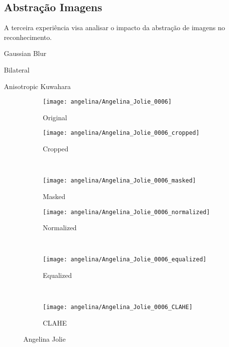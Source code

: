 \subsection{Abstração Imagens}
A terceira experiência visa analisar o impacto da abstração de imagens no reconhecimento.

Gaussian Blur

Bilateral

Anisotropic Kuwahara

\begin{figure}
        \centering
        \begin{subfigure}[b]{0.2\textwidth}
                \centering
                \texttt{[image: angelina/Angelina\_Jolie\_0006]}
                \caption{Original}
                \label{fig:original} 
        \end{subfigure}%
%

        \begin{subfigure}[b]{0.1\textwidth}
                \centering
                \texttt{[image: angelina/Angelina\_Jolie\_0006\_cropped]}
                \caption{Cropped}
                \label{fig:cropped} 
        \end{subfigure}
        ~ ~
        \begin{subfigure}[b]{0.1\textwidth}
                \centering
                \texttt{[image: angelina/Angelina\_Jolie\_0006\_masked]}
                \caption{Masked}
                \label{fig:masked}
        \end{subfigure}%
%

        \begin{subfigure}[b]{0.1\textwidth}
                \centering
                \texttt{[image: angelina/Angelina\_Jolie\_0006\_normalized]}
                \caption{Normalized}
                \label{fig:normalized} 
        \end{subfigure}
        ~ ~
        \begin{subfigure}[b]{0.1\textwidth}
                \centering
                \texttt{[image: angelina/Angelina\_Jolie\_0006\_equalized]}
                \caption{Equalized}
                \label{fig:equalized}
        \end{subfigure}
        ~ ~
        \begin{subfigure}[b]{0.1\textwidth}
                \centering
                \texttt{[image: angelina/Angelina\_Jolie\_0006\_CLAHE]}
                \caption{CLAHE}
                \label{fig:clahe}
        \end{subfigure}
        \caption{Angelina Jolie}
        \label{fig:galeriaspreprocessadas}   
\end{figure}



